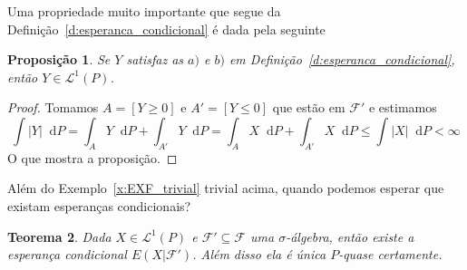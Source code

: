 \documentclass[reqno]{article}
\newcommand*\1{\mathds{1}}
\newtheorem{theorem}{Teorema}[section]
\newtheorem{proposition}[theorem]{Proposição}
\renewcommand*\d{\mathop{}\!\mathrm{d}}
\begin{document}
Uma propriedade muito importante que segue da Definição~\ref{d:esperanca_condicional} é dada pela seguinte

\begin{proposition}
  \label{p:ec_em_L1}
  Se $Y$ satisfaz as $a)$ e $b)$ em Definição~\ref{d:esperanca_condicional}, então $Y \in \mathcal{L}^1(P)$.
\end{proposition}

\begin{proof}
  Tomamos $A = [Y \geq 0]$ e $A' = [Y \leq 0]$ que estão em $\mathcal{F}'$ e estimamos
  \begin{equation}
    \int |Y| \d P = \int_A Y \d P + \int_{A'} Y \d P = \int_A X \d P + \int_{A'} X \d P \leq \int |X| \d P < \infty
  \end{equation}
  O que mostra a proposição.
\end{proof}

Além do Exemplo~\ref{x:EXF_trivial} trivial acima, quando podemos esperar que existam esperanças condicionais?

\begin{theorem}
  Dada $X \in \mathcal{L}^1(P)$ e $\mathcal{F}' \subseteq \mathcal{F}$ uma $\sigma$-álgebra, então existe a esperança condicional $E(X|\mathcal{F}')$.
  Além disso ela é única $P$-quase certamente.
\end{theorem}
\end{document}
